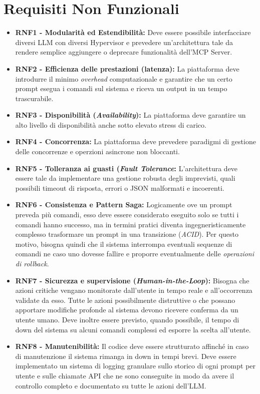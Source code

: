 \section{Requisiti Non Funzionali}
\begin{itemize}
    \item \textbf{RNF1 - Modularità ed Estendibilità:} Deve essere possibile interfacciare diversi LLM con diversi Hypervisor e prevedere un'architettura tale da rendere semplice aggiungere o deprecare funzionalità dell'MCP Server.

    \item \textbf{RNF2 - Efficienza delle prestazioni (latenza):} La piattaforma deve introdurre il minimo \textit{overhead} computazionale e garantire che un certo prompt esegua i comandi sul sistema e riceva un output in un tempo trascurabile.
    
    \item \textbf{RNF3 - Disponibilità (\textit{Availability}):} La piattaforma deve garantire un alto livello di disponibilità anche sotto elevato stress di carico.
    
    \item \textbf{RNF4 - Concorrenza:} La piattaforma deve prevedere paradigmi di gestione delle concorrenze e operzioni asincrone non bloccanti.

    \item \textbf{RNF5 - Tolleranza ai guasti (\textit{Fault Tolerance}:} L'architettura deve essere tale da implementare una gestione robusta degli imprevisti, quali possibili timeout di risposta, errori o JSON malformati e incoerenti.
    
    \item \textbf{RNF6 - Consistenza e Pattern Saga:} Logicamente ove un prompt preveda più comandi, esso deve essere considerato eseguito solo se tutti i comandi hanno successo, ma in termini pratici diventa ingegneristicamente complesso trasformare un prompt in una transizione (\textit{ACID}). Per questo motivo, bisogna quindi che il sistema interrompa eventuali sequenze di comandi ne caso uno dovesse fallire e proporre eventualmente delle \textit{operazioni di rollback}.

    \item \textbf{RNF7 - Sicurezza e supervisione (\textit{Human-in-the-Loop}):} Bisogna che azioni critiche vengano monitorate dall'utente in tempo reale e all'occorrenza validate da esso. Tutte le azioni possibilmente distruttive o che possano apportare modifiche profonde al sistema devono ricevere conferma da un utente umano. Deve inoltre essere previsto, quando possibile, il tempo di down del sistema su alcuni comandi complessi ed esporre la scelta all'utente.

    \item \textbf{RNF8 - Manutenibilità:} Il codice deve essere strutturato affinché in caso di manutenzione il sistema rimanga in down in tempi brevi. Deve essere implementato un sistema di logging granulare sullo storico di ogni prompt per utente e sulle chiamate API che ne sono conseguite in modo da avere il controllo completo e documentato su tutte le azioni dell'LLM.
\end{itemize}